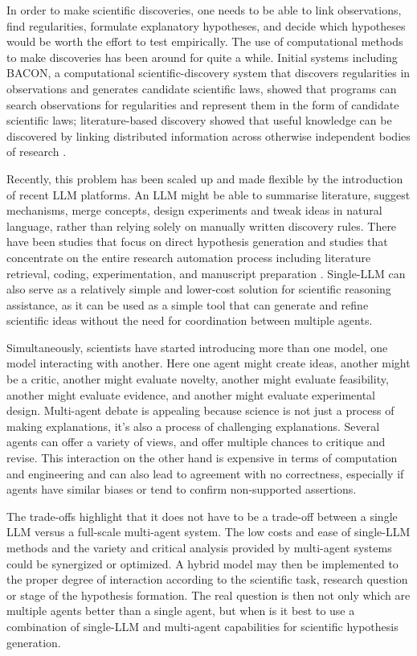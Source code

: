 \documentclass[acmsmall,screen,review]{acmart}
\begin{document}
In order to make scientific discoveries, one needs to be able to link observations, find regularities, formulate explanatory hypotheses, and decide which hypotheses would be worth the effort to test empirically. The use of computational methods to make discoveries has been around for quite a while. Initial systems including BACON, a computational scientific-discovery system that discovers regularities in observations and generates candidate scientific laws, showed that programs can search observations for regularities and represent them in the form of candidate scientific laws; literature-based discovery showed that useful knowledge can be discovered by linking distributed information across otherwise independent bodies of research \cite{swanson1986undiscovered,langley1987scientific}.

Recently, this problem has been scaled up and made flexible by the introduction of recent LLM platforms. An LLM might be able to summarise literature, suggest mechanisms, merge concepts, design experiments and tweak ideas in natural language, rather than relying solely on manually written discovery rules. There have been studies that focus on direct hypothesis generation \cite{zhou2024hypothesis,yang2024large} and studies that concentrate on the entire research automation process including literature retrieval, coding, experimentation, and manuscript preparation \cite{lu2024ai,yamada2026towards}. Single-LLM can also serve as a relatively simple and lower-cost solution for scientific reasoning assistance, as it can be used as a simple tool that can generate and refine scientific ideas without the need for coordination between multiple agents.

Simultaneously, scientists have started introducing more than one model, one model interacting with another. Here one agent might create ideas, another might be a critic, another might evaluate novelty, another might evaluate feasibility, another might evaluate evidence, and another might evaluate experimental design. Multi-agent debate is appealing because science is not just a process of making explanations, it's also a process of challenging explanations. Several agents can offer a variety of views, and offer multiple chances to critique and revise. This interaction on the other hand is expensive in terms of computation and engineering and can also lead to agreement with no correctness, especially if agents have similar biases or tend to confirm non-supported assertions.

The trade-offs highlight that it does not have to be a trade-off between a single LLM versus a full-scale multi-agent system. The low costs and ease of single-LLM methods and the variety and critical analysis provided by multi-agent systems could be synergized or optimized. A hybrid model may then be implemented to the proper degree of interaction according to the scientific task, research question or stage of the hypothesis formation. The real question is then not only which are multiple agents better than a single agent, but when is it best to use a combination of single-LLM and multi-agent capabilities for scientific hypothesis generation.
\end{document}

